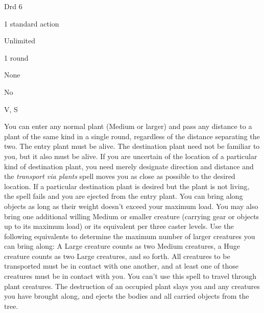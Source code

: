
\begin{description*}
\item[Level:] Drd 6
\item[Casting Time:] 1 standard action
\item[Range:] Unlimited
\item[Duration:] 1 round
\item[Saving Throw:] None
\item[Spell Resistance:] No
\item[Components:] V, S
\end{description*}

You can enter any normal plant (Medium or larger) and pass any distance to a plant
of the same kind in a single round, regardless of the distance separating the two.
The entry plant must be alive. The destination plant need not be familiar to you,
but it also must be alive. If you are uncertain of the location of a particular
kind of destination plant, you need merely designate direction and distance and
the \textit{transport via plants} spell moves you as close as possible to the desired
location. If a particular destination plant is desired but the plant is not living,
the spell fails and you are ejected from the entry plant.
You can bring along objects as long as their weight doesn't exceed your maximum
load. You may also bring one additional willing Medium or smaller creature (carrying
gear or objects up to its maximum load) or its equivalent per three caster levels.
Use the following equivalents to determine the maximum number of larger creatures
you can bring along: A Large creature counts as two Medium creatures, a Huge creature
counts as two Large creatures, and so forth. All creatures to be transported must
be in contact with one another, and at least one of those creatures must be in
contact with you.
You can't use this spell to travel through plant creatures.
The destruction of an occupied plant slays you and any creatures you have brought
along, and ejects the bodies and all carried objects from the tree.